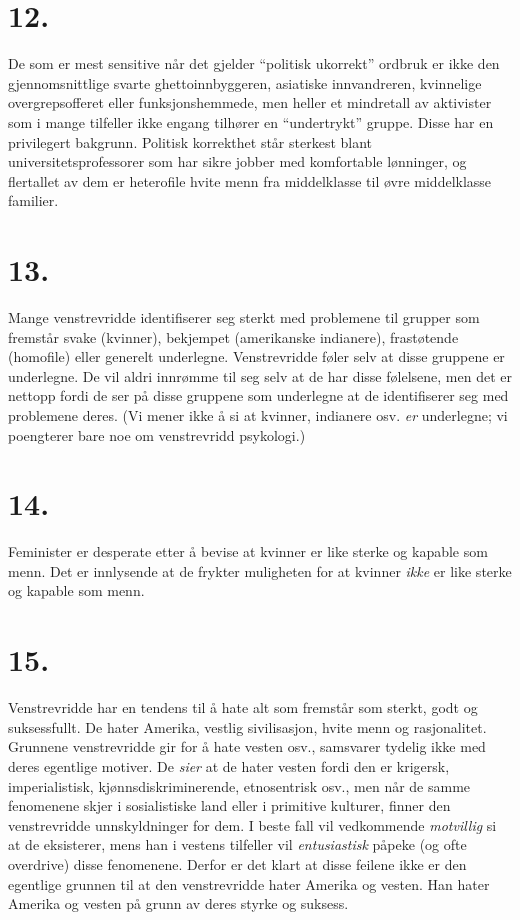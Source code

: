 \documentclass[oneside]{book}
\begin{document}
\section*{12.}
De som er mest sensitive når det gjelder ``politisk ukorrekt'' ordbruk er ikke
den gjennomsnittlige svarte ghettoinnbyggeren, asiatiske innvandreren,
kvinnelige overgrepsofferet eller funksjonshemmede, men heller et mindretall av
aktivister som i mange tilfeller ikke engang tilhører en ``undertrykt'' gruppe.
Disse har en privilegert bakgrunn. Politisk korrekthet står sterkest blant
universitetsprofessorer som har sikre jobber med komfortable lønninger, og
flertallet av dem er heterofile hvite menn fra middelklasse til øvre
middelklasse familier.

\section*{13.}
Mange venstrevridde identifiserer seg sterkt med problemene til grupper som
fremstår svake (kvinner), bekjempet (amerikanske indianere), frastøtende
(homofile) eller generelt underlegne. Venstrevridde føler selv at disse
gruppene er underlegne. De vil aldri innrømme til seg selv at de har disse
følelsene, men det er nettopp fordi de ser på disse gruppene som underlegne at
de identifiserer seg med problemene deres. (Vi mener ikke å si at kvinner,
indianere osv. {\em er} underlegne; vi poengterer bare noe om venstrevridd
psykologi.)

\section*{14.}
Feminister er desperate etter å bevise at kvinner er like sterke og kapable som
menn. Det er innlysende at de frykter muligheten for at kvinner {\em ikke} er
like sterke og kapable som menn.

\section*{15.}
Venstrevridde har en tendens til å hate alt som fremstår som sterkt, godt og
suksessfullt. De hater Amerika, vestlig sivilisasjon, hvite menn og
rasjonalitet. Grunnene venstrevridde gir for å hate vesten osv., samsvarer
tydelig ikke med deres egentlige motiver. De {\em sier} at de hater vesten
fordi den er krigersk, imperialistisk, kjønnsdiskriminerende, etnosentrisk
osv., men når de samme fenomenene skjer i sosialistiske land eller i primitive
kulturer, finner den venstrevridde unnskyldninger for dem. I beste fall vil
vedkommende {\em motvillig} si at de eksisterer, mens han i vestens tilfeller
vil {\em entusiastisk} påpeke (og ofte overdrive) disse fenomenene. Derfor er
det klart at disse feilene ikke er den egentlige grunnen til at den
venstrevridde hater Amerika og vesten. Han hater Amerika og vesten på grunn av
deres styrke og suksess.
\end{document}
